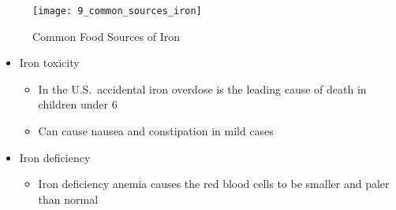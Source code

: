 \documentclass[title={Chapter 9}]{fdsn201notes}
\begin{document}
\begin{figure}[H]
	\centering
	\texttt{[image: 9\_common\_sources\_iron]}
	\caption{Common Food Sources of Iron}
	\label{fig:common-food-sources-of-iron}
\end{figure}

\begin{itemize}
	\item Iron toxicity
	\begin{itemize}
		\item In the U.S.\ accidental iron overdose is the leading cause of death in children under 6
		\item Can cause nausea and constipation in mild cases
	\end{itemize}
	\item Iron deficiency
	\begin{itemize}
		\item Iron deficiency anemia causes the red blood cells to be smaller and paler than normal
	\end{itemize}
\end{itemize}
\end{document}
